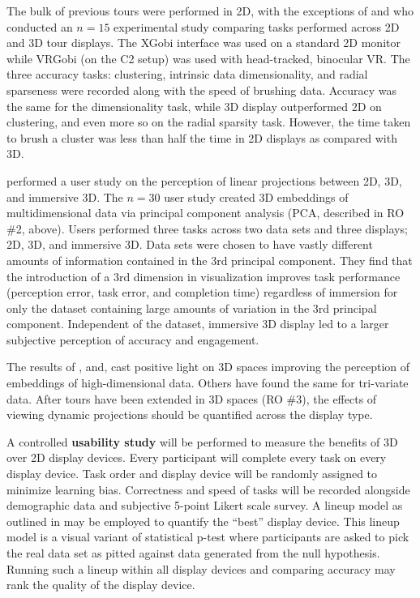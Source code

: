 \documentclass{monashthesis}
\begin{document}
The bulk of previous tours were performed in 2D, with the exceptions of \textcite{nelson_xgobi_1998} and \textcite{arms_benefits_1999} who conducted an \(n=15\) experimental study comparing tasks performed across 2D and 3D tour displays. The XGobi interface was used on a standard 2D monitor while VRGobi (on the C2 setup) was used with head-tracked, binocular VR. The three accuracy tasks: clustering, intrinsic data dimensionality, and radial sparseness were recorded along with the speed of brushing data. Accuracy was the same for the dimensionality task, while 3D display outperformed 2D on clustering, and even more so on the radial sparsity task. However, the time taken to brush a cluster was less than half the time in 2D displays as compared with 3D.

\textcite{wagner_filho_immersive_2018} performed a user study on the perception of linear projections between 2D, 3D, and immersive 3D. The \(n=30\) user study created 3D embeddings of multidimensional data via principal component analysis (PCA, described in RO \#2, above). Users performed three tasks across two data sets and three displays; 2D, 3D, and immersive 3D. Data sets were chosen to have vastly different amounts of information contained in the 3rd principal component. They find that the introduction of a 3rd dimension in visualization improves task performance (perception error, task error, and completion time) regardless of immersion for only the dataset containing large amounts of variation in the 3rd principal component. Independent of the dataset, immersive 3D display led to a larger subjective perception of accuracy and engagement.

The results of \textcite{wagner_filho_immersive_2018}, \textcite{nelson_xgobi_1998} and, \textcite{arms_benefits_1999} cast positive light on 3D spaces improving the perception of embeddings of high-dimensional data. Others have found the same for tri-variate data. After tours have been extended in 3D spaces (RO \#3), the effects of viewing dynamic projections should be quantified across the display type.

A controlled \textbf{usability study} will be performed to measure the benefits of 3D over 2D display devices. Every participant will complete every task on every display device. Task order and display device will be randomly assigned to minimize learning bias. Correctness and speed of tasks will be recorded alongside demographic data and subjective 5-point Likert scale survey. A lineup model as outlined in \textcite{hofmann_graphical_2012} may be employed to quantify the ``best'' display device. This lineup model is a visual variant of statistical p-test where participants are asked to pick the real data set as pitted against data generated from the null hypothesis. Running such a lineup within all display devices and comparing accuracy may rank the quality of the display device.
\end{document}
